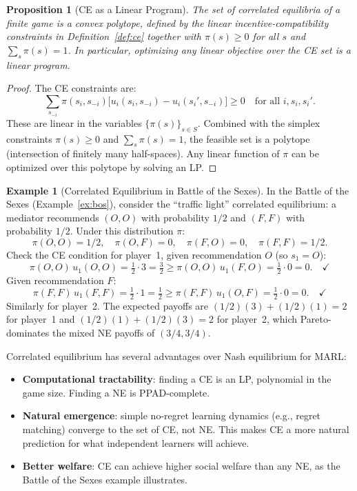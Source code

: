 \documentclass[11pt,a4paper]{article}
\theoremstyle{definition}
\newtheorem{example}{Example}[section]
\theoremstyle{plain}
\newtheorem{proposition}[theorem]{Proposition}
\theoremstyle{remark}
\begin{document}
\begin{proposition}[CE as a Linear Program]
\label{prop:ce_lp}
The set of correlated equilibria of a finite game is a convex polytope, defined by the
linear incentive-compatibility constraints in Definition~\ref{def:ce} together with
$\pi(s) \geq 0$ for all $s$ and $\sum_s \pi(s) = 1$. In particular, optimizing any
linear objective over the CE set is a linear program.
\end{proposition}

\begin{proof}
The CE constraints are:
\[
    \sum_{s_{-i}} \pi(s_i, s_{-i})\big[u_i(s_i, s_{-i}) - u_i(s_i', s_{-i})\big] \geq 0
    \quad \text{for all } i, s_i, s_i'.
\]
These are linear in the variables $\{\pi(s)\}_{s \in S}$. Combined with the simplex
constraints $\pi(s) \geq 0$ and $\sum_s \pi(s) = 1$, the feasible set is a polytope
(intersection of finitely many half-spaces). Any linear function of $\pi$ can be
optimized over this polytope by solving an LP.
\end{proof}

\begin{example}[Correlated Equilibrium in Battle of the Sexes]
\label{ex:ce_bos}
In the Battle of the Sexes (Example~\ref{ex:bos}), consider the ``traffic light''
correlated equilibrium: a mediator recommends $(O,O)$ with probability $1/2$ and
$(F,F)$ with probability $1/2$. Under this distribution $\pi$:
\[
    \pi(O,O) = 1/2, \quad \pi(O,F) = 0, \quad \pi(F,O) = 0, \quad \pi(F,F) = 1/2.
\]
Check the CE condition for player~1, given recommendation $O$ (so $s_1 = O$):
\[
    \pi(O,O)\, u_1(O,O) = \tfrac{1}{2} \cdot 3 = \tfrac{3}{2}
    \geq \pi(O,O)\, u_1(F,O) = \tfrac{1}{2} \cdot 0 = 0. \quad \checkmark
\]
Given recommendation $F$:
\[
    \pi(F,F)\, u_1(F,F) = \tfrac{1}{2} \cdot 1 = \tfrac{1}{2}
    \geq \pi(F,F)\, u_1(O,F) = \tfrac{1}{2} \cdot 0 = 0. \quad \checkmark
\]
Similarly for player~2. The expected payoffs are
$(1/2)(3) + (1/2)(1) = 2$ for player~1 and $(1/2)(1) + (1/2)(3) = 2$ for player~2,
which Pareto-dominates the mixed NE payoffs of $(3/4, 3/4)$.
\end{example}

\begin{rlconnection}
Correlated equilibrium has several advantages over Nash equilibrium for MARL:
\begin{itemize}[nosep]
    \item \textbf{Computational tractability}: finding a CE is an LP, polynomial in
    the game size. Finding a NE is PPAD-complete.
    \item \textbf{Natural emergence}: simple no-regret learning dynamics (e.g., regret
    matching) converge to the set of CE, not NE. This makes CE a more natural
    prediction for what independent learners will achieve.
    \item \textbf{Better welfare}: CE can achieve higher social welfare than any NE,
    as the Battle of the Sexes example illustrates.
\end{itemize}
\end{rlconnection}
\end{document}

